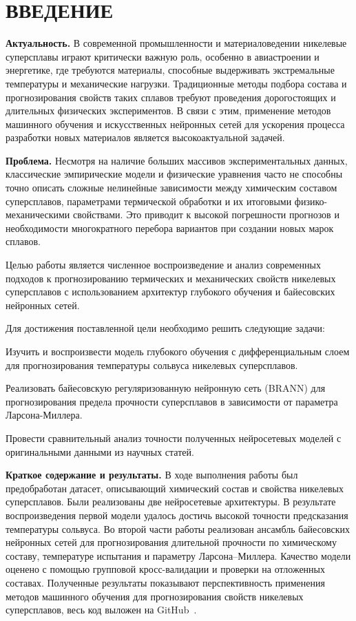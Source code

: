 \chapter*{\centering ВВЕДЕНИЕ}

\textbf{Актуальность.} 
В современной промышленности и материаловедении никелевые суперсплавы 
играют критически важную роль, особенно в авиастроении и энергетике, 
где требуются материалы, способные выдерживать экстремальные 
температуры и механические нагрузки. Традиционные методы подбора 
состава и прогнозирования свойств таких сплавов требуют проведения 
дорогостоящих и длительных физических экспериментов. В связи с этим, 
применение методов машинного обучения и искусственных нейронных сетей 
для ускорения процесса разработки новых материалов является 
высокоактуальной задачей.

\textbf{Проблема.} 
Несмотря на наличие больших массивов экспериментальных данных, 
классические эмпирические модели и физические уравнения часто не 
способны точно описать сложные нелинейные зависимости между 
химическим составом суперсплавов, параметрами термической обработки 
и их итоговыми физико-механическими свойствами. Это приводит к 
высокой погрешности прогнозов и необходимости многократного 
перебора вариантов при создании новых марок сплавов.

Целью работы является численное воспроизведение и анализ современных 
подходов к прогнозированию термических и механических свойств 
никелевых суперсплавов с использованием архитектур глубокого 
обучения и байесовских нейронных сетей.

Для достижения поставленной цели необходимо решить следующие задачи:
\begin{enumeratePaper}
    \item Изучить и воспроизвести модель глубокого обучения с 
    дифференциальным слоем для прогнозирования температуры сольвуса 
    никелевых суперсплавов.
    \item Реализовать байесовскую регуляризованную нейронную сеть (BRANN) 
    для прогнозирования предела прочности суперсплавов в зависимости 
    от параметра Ларсона-Миллера. 
    \item Провести сравнительный анализ точности полученных нейросетевых 
    моделей с оригинальными данными из научных статей.
\end{enumeratePaper}

\textbf{Краткое содержание и результаты.} 
В ходе выполнения работы был предобработан датасет, описывающий 
химический состав и свойства никелевых суперсплавов. Были реализованы две нейросетевые 
архитектуры. В результате воспроизведения первой модели удалось достичь 
высокой точности предсказания температуры сольвуса.
Во второй части работы реализован ансамбль байесовских
нейронных сетей для прогнозирования длительной прочности
по химическому составу, температуре испытания
и параметру Ларсона--Миллера.
Качество модели оценено с помощью групповой кросс-валидации
и проверки на отложенных составах.
Полученные результаты показывают перспективность применения
методов машинного обучения для прогнозирования
свойств никелевых суперсплавов, весь код выложен на GitHub~\cite{notebook}.
\newpage